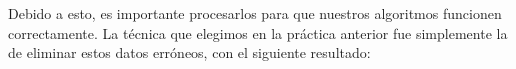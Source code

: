 \documentclass[11pt,a4paper]{article}
\begin{document}
\begin{table}[H]
    \centering
\end{table}

Debido a esto, es importante procesarlos para que nuestros algoritmos funcionen correctamente. La técnica que elegimos en la práctica
anterior fue simplemente la de eliminar estos datos erróneos, con el siguiente resultado:
\end{document}
